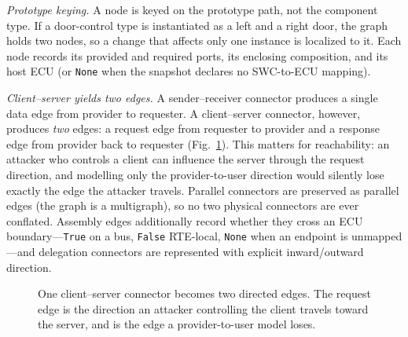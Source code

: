 \documentclass[journal]{IEEEtran}
\begin{document}
\emph{Prototype keying.} A node is keyed on the prototype path, not the
component type. If a door-control type is instantiated as a left and a right
door, the graph holds two nodes, so a change that affects only one instance is
localized to it. Each node records its provided and required ports, its
enclosing composition, and its host ECU (or \texttt{None} when the snapshot
declares no SWC-to-ECU mapping).

\emph{Client--server yields two edges.} A sender--receiver connector produces a
single data edge from provider to requester. A client--server connector,
however, produces \emph{two} edges: a request edge from requester to provider
and a response edge from provider back to requester (Fig.~\ref{fig:cs}). This
matters for reachability: an attacker who controls a client can influence the
server through the request direction, and modelling only the provider-to-user
direction would silently lose exactly the edge the attacker travels. Parallel
connectors are preserved as parallel edges (the graph is a multigraph), so no
two physical connectors are ever conflated. Assembly edges additionally record
whether they cross an ECU boundary---\texttt{True} on a bus, \texttt{False}
RTE-local, \texttt{None} when an endpoint is unmapped---and delegation
connectors are represented with explicit inward/outward direction.

\begin{figure}[t]
\centering
{}
\caption{One client--server connector becomes two directed edges. The request
edge is the direction an attacker controlling the client travels toward the
server, and is the edge a provider-to-user model loses.}
\label{fig:cs}
\end{figure}
\end{document}
